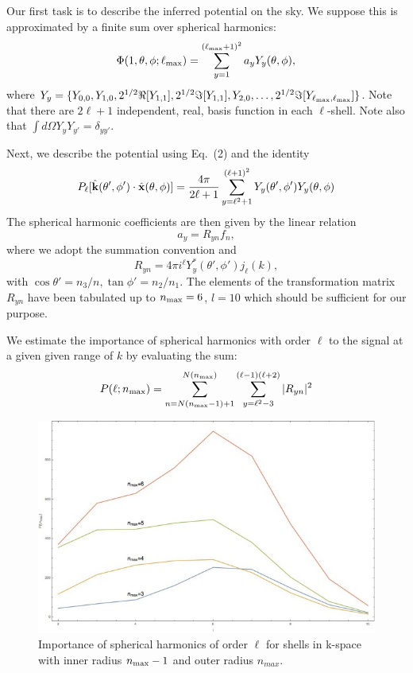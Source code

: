 \documentclass[12pt]{article}
\def\Response{R_{yn}}
\begin{document}
Our first task is to describe the inferred potential on the sky. We suppose this is approximated by a finite sum over spherical harmonics:
\begin{equation}
\Phi(1,\theta,\phi;\ell_{\rm max})=\sum_{y=1}^{(\ell_{\rm max}+1)^2}a_yY_y(\theta,\phi),
\end{equation}
where $Y_y=\{Y_{0,0},Y_{1,0},2^{1/2}\Re[Y_{1,1}],2^{1/2}\Im[Y_{1,1}],Y_{2,0},\dots,2^{1/2}\Im[Y_{\ell_{\rm max},\ell_{\rm max}}]\}$. Note that there are $2\ell+1$ independent, real, basis function in each $\ell$-shell. Note also that $\int d\Omega Y_yY_{y'}=\delta_{yy'}$.

Next, we describe the potential using Eq.~(2) and the identity
\begin{equation}
P_{\ell}[\hat{\bf k}(\theta',\phi')\cdot\hat{\bf x}(\theta,\phi)]=\frac{4\pi}{2\ell+1}\sum_{y=\ell^2+1}^{(\ell+1)^2}Y_y(\theta',\phi')Y_y(\theta,\phi)
\end{equation}
The spherical harmonic coefficients are then given by the linear relation
\begin{equation}
a_y=\Response f_n,
\end{equation}
where we adopt the summation convention and
\begin{equation}
\Response =4\pi i^\ell Y_y^\ast(\theta',\phi')j_\ell(k),
\end{equation}
with $\cos\theta'=n_3/n,\tan\phi'=n_2/n_1$. The elements of the transformation matrix $\Response$ have been tabulated up to $n_{\rm max}=6$, $l=10$ which should be sufficient for our purpose.

We estimate the importance of spherical harmonics with order $\ell$ to the signal at a given given range of $k$ by evaluating the sum:
\begin{equation}
P(\ell;n_{\rm max})=\sum_{n=N(n_{\rm max}-1)+1}^{N(n_{\rm max})}\sum_{y=\ell^2-3}^{(\ell-1)(\ell+2)}|\Response|^2
\end{equation}
\begin{figure}[h!]
\centering
\includegraphics[width=6in]{fig6.jpg}
\caption{Importance of spherical harmonics of order $\ell$ for shells in k-space with inner radius $n_{\rm max}-1$ and outer radius $n_{max}$.}
\end{figure}
\end{document}
